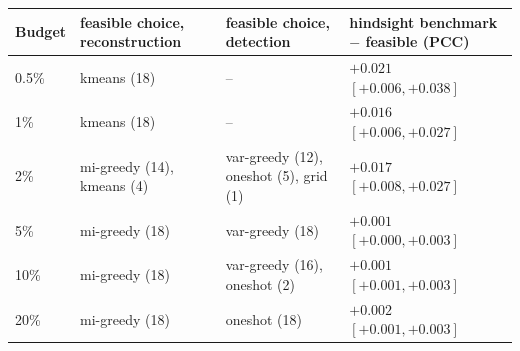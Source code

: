 \begin{tabular}{llll}
\toprule
Budget & feasible choice, reconstruction & feasible choice, detection & hindsight benchmark $-$ feasible (PCC) \\
\midrule
0.5\% & kmeans (18) & -- & ${+}0.021$ $[{+}0.006, {+}0.038]$ \\
1\% & kmeans (18) & -- & ${+}0.016$ $[{+}0.006, {+}0.027]$ \\
2\% & mi-greedy (14), kmeans (4) & var-greedy (12), oneshot (5), grid (1) & ${+}0.017$ $[{+}0.008, {+}0.027]$ \\
5\% & mi-greedy (18) & var-greedy (18) & ${+}0.001$ $[{+}0.000, {+}0.003]$ \\
10\% & mi-greedy (18) & var-greedy (16), oneshot (2) & ${+}0.001$ $[{+}0.001, {+}0.003]$ \\
20\% & mi-greedy (18) & oneshot (18) & ${+}0.002$ $[{+}0.001, {+}0.003]$ \\
\bottomrule
\end{tabular}